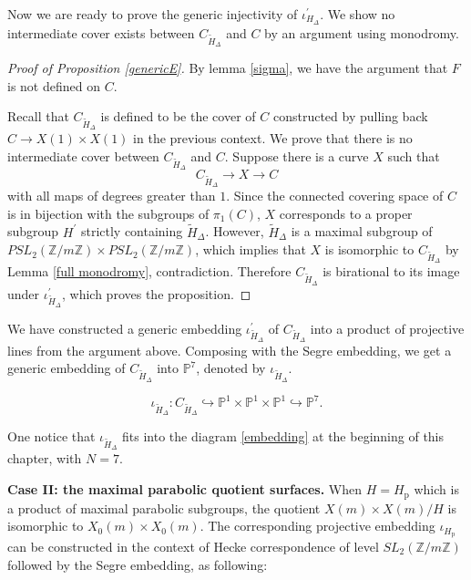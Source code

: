 \documentclass[12pt]{amsart}
\theoremstyle{definition}
\theoremstyle{remark}
\numberwithin{equation}{section}
\newcommand{\Z}{\mathbb{Z}}
\renewcommand{\P}{\mathbb{P}}
\begin{document}
  
  
 \vspace{1em}
	  Now we are ready to prove the generic injectivity of $\iota^{\prime}_{H_{\Delta}}$. We show no intermediate cover exists between $C_{\tilde{H}_\Delta}$ and $C$ by an argument using monodromy. 	 
  
  \begin{proof}[\textit{Proof of Proposition \ref{genericE}}]
  By lemma \ref{sigma}, we have the argument that $F$ is not defined on $C$.
  
  Recall that $C_{\tilde{H}_{\Delta}}$ is defined to be the cover of $C$ constructed by pulling back $C \to X(1) \times X(1)$ in the previous context. We prove that there is no intermediate cover between $C_{\tilde{H}_{\Delta}}$ and $C$. Suppose there is a curve $X$ such that 
  $$C_{\tilde{H}_{\Delta}} \to X \to C$$
  with all maps of degrees greater than $1$. Since the connected covering space of $C$ is in bijection with the subgroups of $\pi_{1}(C)$, $X$ corresponds to a proper subgroup $H^{\prime}$ strictly containing $\tilde{H}_{\Delta}$. However, $\tilde{H}_{\Delta}$ is a maximal subgroup of $PSL_{2}(\Z/m\Z) \times PSL_{2}(\Z/m\Z)$, which implies that $X$ is isomorphic to $C_{\tilde{H}_{\Delta}}$ by Lemma \ref{full monodromy}, contradiction.
  Therefore $C_{\tilde{H}_{\Delta}}$ is birational to its image under $\iota_{\tilde{H}_{\Delta}}^{\prime}$, which proves the proposition.    	 	
 	  \end{proof}
 	  
\vspace{1em} 	  
We have constructed a generic embedding $\iota^{\prime}_{\tilde{H}_{\Delta}}$ of $C_{\tilde{H}_{\Delta}}$ into a product of projective lines from the argument above. Composing with the Segre embedding, we get a generic embedding of $C_{\tilde{H}_{\Delta}}$ into $\P^{7}$, denoted by $\iota_{\tilde{H}_{\Delta}}$.

$$\iota_{\tilde{H}_{\Delta}}: C_{\tilde{H}_{\Delta}} \hookrightarrow \P^{1} \times \P^{1} \times \P^{1} \hookrightarrow \P^{7}.$$

One notice that $\iota_{\tilde{H}_{\Delta}}$ fits into the diagram \ref{embedding} at the beginning of this chapter, with $N=7$. 

\vspace{1em}
\noindent \textbf{Case II: the maximal parabolic quotient surfaces.}
   When $H=H_{\operatorname{p}}$ which is a product of maximal parabolic subgroups, the quotient $X(m) \times X(m)/H$ is isomorphic to $X_{0}(m) \times X_{0}(m)$. The corresponding projective embedding $\iota_{H_{\operatorname{p}}}$ can be constructed in the context of Hecke correspondence of level $SL_{2}(\Z/m\Z)$ followed by the Segre embedding, as following:
   
\end{document}
